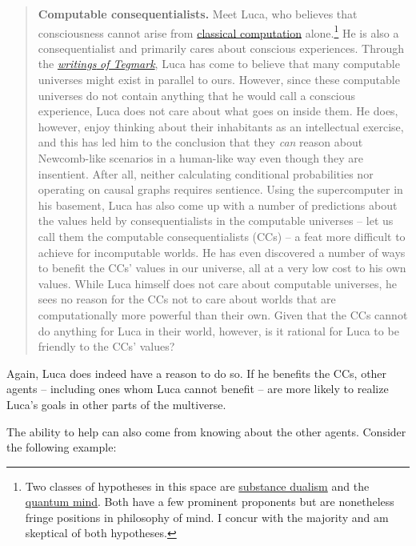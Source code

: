 \begin{quote}
\textbf{Computable consequentialists.} Meet Luca, who believes that
consciousness cannot arise from
\href{https://en.wikipedia.org/wiki/Computability}{classical
computation} alone.\footnote{Two classes of hypotheses in this space
  are
  \href{https://en.wikipedia.org/wiki/Mind\%E2\%80\%93body_dualism\#Substance_dualism}{substance
  dualism} and the
  \href{https://en.wikipedia.org/wiki/Quantum_mind}{quantum
  mind}. Both have a few prominent proponents but are nonetheless
  fringe positions in philosophy of mind. I concur with the majority and
  am skeptical of both hypotheses.} He is also a consequentialist and
primarily cares about conscious experiences. Through the
\href{https://en.wikipedia.org/wiki/Mathematical_universe_hypothesis}{\emph{writings}
\emph{of Tegmark}}, Luca has come to believe that many computable
universes might exist in parallel to ours. However, since these
computable universes do not contain anything that he would call a
conscious experience, Luca does not care about what goes on inside them.
He does, however, enjoy thinking about their inhabitants as an
intellectual exercise, and this has led him to the conclusion that they
\emph{can} reason about Newcomb-like scenarios in a human-like way even
though they are insentient. After all, neither calculating conditional
probabilities nor operating on causal graphs requires sentience. Using
the supercomputer in his basement, Luca has also come up with a number
of predictions about the values held by consequentialists in the
computable universes -- let us call them the computable
consequentialists (CCs) -- a feat more difficult to achieve for
incomputable worlds. He has even discovered a number of ways to benefit
the CCs' values in our universe, all at a very low cost to his own
values. While Luca himself does not care about computable universes, he
sees no reason for the CCs not to care about worlds that are
computationally more powerful than their own. Given that the CCs cannot
do anything for Luca in their world, however, is it rational for Luca to
be friendly to the CCs' values?
\end{quote}

Again, Luca does indeed have a reason to do so. If he benefits the CCs,
other agents -- including ones whom Luca cannot benefit -- are more
likely to realize Luca's goals in other parts of the multiverse.

The ability to help can also come from knowing about the other agents.
Consider the following example:

